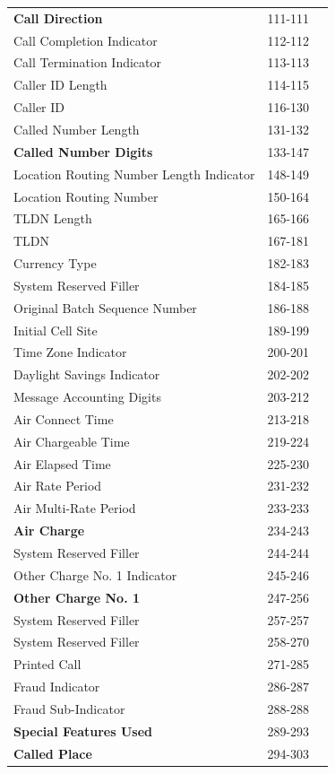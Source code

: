 \documentclass[12pt,twoside]{article}
\begin{document}
\begin{longtable}{l|l|l}
\textbf{Call Direction} & 111-111 & \\
Call Completion Indicator & 112-112 & \\
Call Termination Indicator & 113-113 & \\
Caller ID Length & 114-115 & \\
Caller ID & 116-130 & \\
Called Number Length & 131-132 & \\
\textbf{Called Number Digits} & 133-147 & \\
Location Routing Number Length Indicator & 148-149 & \\
Location Routing Number & 150-164 & \\
TLDN Length & 165-166 & \\
TLDN & 167-181 & \\
Currency Type & 182-183 & \\
System Reserved Filler & 184-185 & \\
Original Batch Sequence Number & 186-188 & \\
Initial Cell Site & 189-199 & \\
Time Zone Indicator & 200-201 & \\
Daylight Savings Indicator & 202-202 & \\
Message Accounting Digits & 203-212 & \\
Air Connect Time & 213-218 & \\
Air Chargeable Time & 219-224 & \\
Air Elapsed Time & 225-230 & \\
Air Rate Period & 231-232 & \\
Air Multi-Rate Period & 233-233 & \\
\textbf{Air Charge} & 234-243 & \\
System Reserved Filler & 244-244 & \\
Other Charge No. 1 Indicator & 245-246 & \\
\textbf{Other Charge No. 1} & 247-256 & \\
System Reserved Filler & 257-257 & \\
System Reserved Filler & 258-270 & \\
Printed Call & 271-285 & \\
Fraud Indicator & 286-287 & \\
Fraud Sub-Indicator & 288-288 & \\
\textbf{Special Features Used} & 289-293 & \\
\textbf{Called Place} & 294-303 & \\

\end{longtable}
\end{document}
